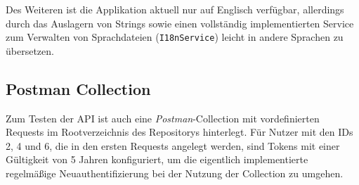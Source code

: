 Des Weiteren ist die Applikation aktuell nur auf Englisch verfügbar, allerdings durch das Auslagern von Strings sowie einen vollständig implementierten
Service zum Verwalten von Sprachdateien (\texttt{I18nService}) leicht in andere Sprachen zu übersetzen.

\subsection{Postman Collection}

Zum Testen der API ist auch eine \textit{Postman}-Collection mit vordefinierten Requests im Rootverzeichnis des Repositorys hinterlegt.
Für Nutzer mit den IDs 2, 4 und 6, die in den ersten Requests angelegt werden, sind Tokens mit einer Gültigkeit von
5 Jahren konfiguriert, um die eigentlich implementierte regelmäßige Neuauthentifizierung bei der Nutzung der Collection zu umgehen.
